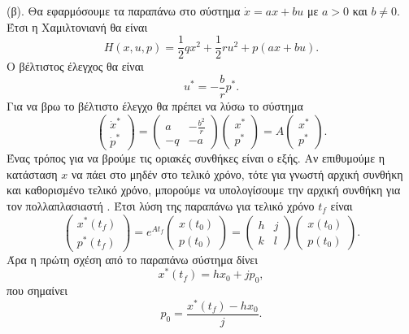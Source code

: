 \begin{solution}
    (β). Θα εφαρμόσουμε τα παραπάνω στο σύστημα \( \dot{x} = ax + bu \) με \( a >
    0 \) και \( b \neq 0 \). Έτσι η Χαμιλτονιανή θα είναι
    \[
        H(x, u, p) = \frac{1}{2}qx^2 + \frac{1}{2}ru^2 + p(ax + bu).
    \]
    Ο βέλτιστος έλεγχος θα είναι
    \[
        u^* = -\frac{b}{r}p^*.
    \]
    Για να βρω το βέλτιστο έλεγχο θα πρέπει να λύσω το σύστημα
    \begin{equation*}
        \begin{pmatrix}
            \dot{x}^* \\
            \dot{p}^*
        \end{pmatrix} =
        \begin{pmatrix}
            a & -\frac{b^2}{r} \\
            -q & -a
        \end{pmatrix}
        \begin{pmatrix}
            x^* \\
            p^*
        \end{pmatrix} = A
        \begin{pmatrix}
            x^* \\
            p^*
        \end{pmatrix}.
    \end{equation*}
    Ένας τρόπος για να βρούμε τις οριακές συνθήκες είναι ο εξής. Αν επιθυμούμε
    η κατάσταση \( x \) να πάει στο μηδέν στο τελικό χρόνο, τότε
    για γνωστή αρχική συνθήκη και καθορισμένο τελικό χρόνο, μπορούμε να
    υπολογίσουμε την αρχική συνθήκη για τον πολλαπλασιαστή . Έτσι
    λύση της παραπάνω για τελικό χρόνο \( t_f \) είναι
    \begin{equation*}
        \begin{pmatrix}
            x^*(t_f) \\
            p^*(t_f)
        \end{pmatrix} =
        e^{At_f}
        \begin{pmatrix}
            x(t_0) \\
            p(t_0)
        \end{pmatrix} =
        \begin{pmatrix}
            h & j \\
            k & l
        \end{pmatrix}
        \begin{pmatrix}
            x(t_0) \\
            p(t_0)
        \end{pmatrix}.
    \end{equation*}
    Άρα η πρώτη σχέση από το παραπάνω σύστημα δίνει
    \[
        x^*(t_f) = hx_0 + j p_0,
    \]
    που σημαίνει
    \[
        p_0 = \frac{x^*(t_f) - hx_0}{j}.
    \]


\end{solution}
